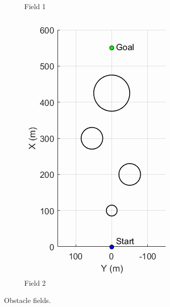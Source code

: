 \documentclass[12pt,twocolumn]{article}
\begin{document}
\begin{figure}
\begin{subfigure}[b]{0.49\columnwidth}
		\caption{{\small Field 1}}   
		\label{fig:Obst1}
	\end{subfigure}
	\hfill
	\begin{subfigure}[b]{0.49\columnwidth}
		\centering
		\includegraphics[width=\columnwidth]{Figs/ObstacleField2.png}
		\caption{\small Field 2}   
		\label{fig:Obst2}
	\end{subfigure}
	\caption{\small Obstacle fields.}
	\label{fig:Obst}
\end{figure}
\end{document}
